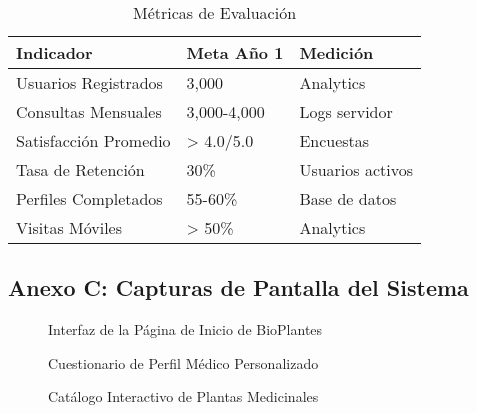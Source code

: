 \documentclass[12pt,a4paper]{article}
\begin{document}
\begin{table}[H]
\centering
\caption{Métricas de Evaluación}
\label{tab:metricas}
\begin{tabular}{|p{5.5cm}|p{3cm}|p{3.5cm}|}
\hline
\textbf{Indicador} & \textbf{Meta Año 1} & \textbf{Medición} \\ \hline
Usuarios Registrados & 3,000 & Analytics \\ \hline
Consultas Mensuales & 3,000-4,000 & Logs servidor \\ \hline
Satisfacción Promedio & > 4.0/5.0 & Encuestas \\ \hline
Tasa de Retención & 30\% & Usuarios activos \\ \hline
Perfiles Completados & 55-60\% & Base de datos \\ \hline
Visitas Móviles & > 50\% & Analytics \\ \hline
\end{tabular}
\end{table}

\newpage

\subsection{Anexo C: Capturas de Pantalla del Sistema}

\begin{figure}[H]
    \centering
    \caption{Interfaz de la Página de Inicio de BioPlantes}
    \label{fig:screenshot_home}
\end{figure}

\begin{figure}[H]
    \centering
    \caption{Cuestionario de Perfil Médico Personalizado}
    \label{fig:screenshot_onboarding}
\end{figure}

\begin{figure}[H]
    \centering
    \caption{Catálogo Interactivo de Plantas Medicinales}
    \label{fig:screenshot_catalogo}
\end{figure}
\end{document}
